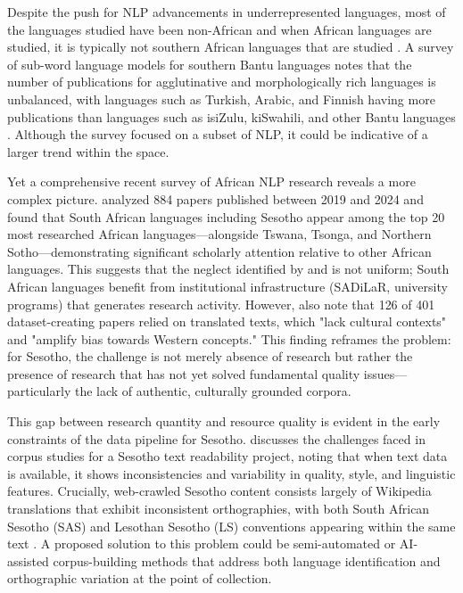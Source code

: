 \documentclass[12pt]{ThesisRU}
\begin{document}
\vspace{1em}
Despite the push for NLP advancements in underrepresented languages, most of the languages studied have been non-African and when African languages are studied, it is typically not southern African languages that are studied \citep{joshi-etal-2020-state}. A survey of sub-word language models for southern Bantu languages notes that the number of publications for agglutinative and morphologically rich languages is unbalanced, with languages such as Turkish, Arabic, and Finnish having more publications than languages such as isiZulu, kiSwahili, and other Bantu languages \citep{Kambarami2021}. Although the survey focused on a subset of NLP, it could be indicative of a larger trend within the space. 

Yet a comprehensive recent survey of African NLP research reveals a more complex picture. \citet{alabi-etal-2025-charting} analyzed 884 papers published between 2019 and 2024 and found that South African languages including Sesotho appear among the top 20 most researched African languages—alongside Tswana, Tsonga, and Northern Sotho—demonstrating significant scholarly attention relative to other African languages. This suggests that the neglect identified by \citet{Kambarami2021} and \citep{joshi-etal-2020-state} is not uniform; South African languages benefit from institutional infrastructure (SADiLaR, university programs) that generates research activity. However, \citet{alabi-etal-2025-charting} also note that 126 of 401 dataset-creating papers relied on translated texts, which "lack cultural contexts" and "amplify bias towards Western concepts." This finding reframes the problem: for Sesotho, the challenge is not merely absence of research but rather the presence of research that has not yet solved fundamental quality issues—particularly the lack of authentic, culturally grounded corpora.

This gap between research quantity and resource quality is evident in the early constraints of the data pipeline for Sesotho. \citet{Sibeko2024} discusses the challenges faced in corpus studies for a Sesotho text readability project, noting that when text data is available, it shows inconsistencies and variability in quality, style, and linguistic features. Crucially, web-crawled Sesotho content consists largely of Wikipedia translations that exhibit inconsistent orthographies, with both South African Sesotho (SAS) and Lesothan Sesotho (LS) conventions appearing within the same text \citep{Sibeko2024}. A proposed solution to this problem could be semi-automated or AI-assisted corpus-building methods that address both language identification and orthographic variation at the point of collection.
\end{document}
